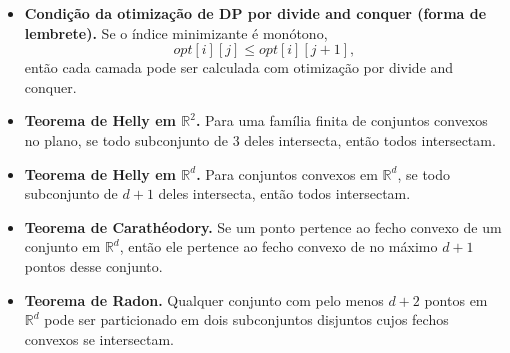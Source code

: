 \begin{itemize}[leftmargin=*,label={}]
  \item \textbf{Condi\c{c}\~ao da otimiza\c{c}\~ao de DP por divide and conquer (forma de lembrete).}
  Se o \'indice minimizante \'e mon\'otono,
  \[
    opt[i][j] \le opt[i][j+1],
  \]
  ent\~ao cada camada pode ser calculada com otimiza\c{c}\~ao por divide and conquer.

  \item \textbf{Teorema de Helly em $\mathbb{R}^2$.}
  Para uma fam\'ilia finita de conjuntos convexos no plano, se todo subconjunto de $3$ deles intersecta, ent\~ao todos intersectam.

  \item \textbf{Teorema de Helly em $\mathbb{R}^d$.}
  Para conjuntos convexos em $\mathbb{R}^d$, se todo subconjunto de $d+1$ deles intersecta, ent\~ao todos intersectam.

  \item \textbf{Teorema de Carath\'eodory.}
  Se um ponto pertence ao fecho convexo de um conjunto em $\mathbb{R}^d$, ent\~ao ele pertence ao fecho convexo de no m\'aximo $d+1$ pontos desse conjunto.

  \item \textbf{Teorema de Radon.}
  Qualquer conjunto com pelo menos $d+2$ pontos em $\mathbb{R}^d$ pode ser particionado em dois subconjuntos disjuntos cujos fechos convexos se intersectam.
\end{itemize}

\fi
